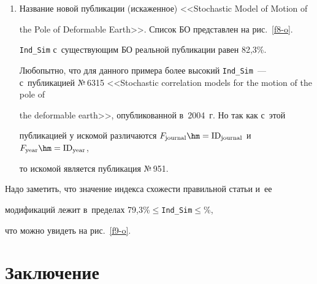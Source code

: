 {\begin{enumerate}[1.]
\item Название новой публикации (искаженное) <<Stochastic Model of Motion of


the Pole of Deformable Earth>>. Список БО представлен на рис.~\ref{f8-o}.











  \verb"Ind_Sim" с~существующим БО реальной публикации равен 82,3\%.











  Любопытно, что для данного примера более высокий \verb"Ind_Sim"~--- с~публикацией №\,6315 <<Stochastic correlation models for the motion of the pole of


the deformable earth>>, опубликованной в~2004~г. Но так как с~этой


публикацией у искомой различаются  $F_{\mathrm{journal}}\hm =


\mathrm{ID}_{\mathrm{journal}}$ и~$F_{\mathrm{year}}\hm= \mathrm{ID}_{\mathrm{year}}$,


то искомой является публикация №\,951.





\end{enumerate}











  Надо заметить, что значение индекса схожести правильной статьи и~ее


модификаций лежит в~пределах 79,3\%\;$\leq$\;\verb"Ind_Sim"\;$\leq$\%,


что можно увидеть на рис.~\ref{f9-o}.











\section{Заключение}





}
